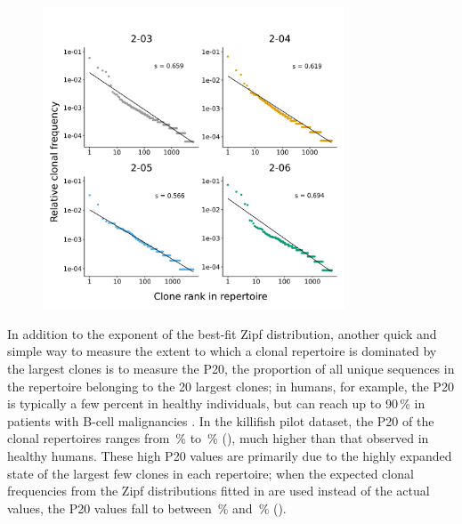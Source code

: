 \begin{figure}
\centering
\includegraphics[width=0.8\textwidth]{_Figures/png/pilot-clones-zipf-fit-null}
\label{fig:igseq-pilot-clones-zipf-fit-null}
\end{figure}

In addition to the exponent of the best-fit Zipf distribution, another quick and simple way to measure the extent to which a clonal repertoire is dominated by the largest clones is to measure the P20, the proportion of all unique sequences in the repertoire belonging to the 20 largest clones; in humans, for example, the P20 is typically a few percent in healthy individuals, but can reach up to 90\,\% in patients with B-cell malignancies \parencite{rosenfeld2018clonesize}. In the killifish pilot dataset, the P20 of the clonal repertoires ranges from \,\% to \,\% (), much higher than that observed in healthy humans. These high P20 values are primarily due to the highly expanded state of the largest few clones in each repertoire; when the expected clonal frequencies from the Zipf distributions fitted in  are used instead of the actual values, the P20 values fall to between \,\% and \,\% ().

